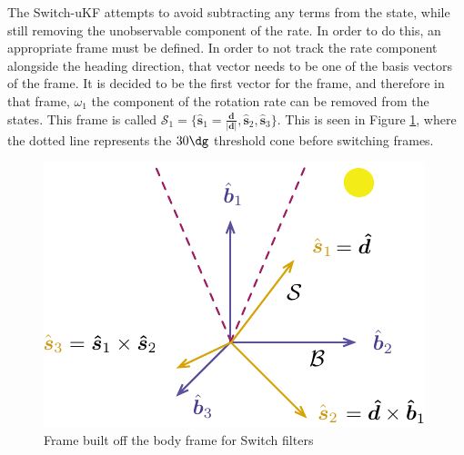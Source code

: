 \documentclass[]{BasiliskReportMemo}
\begin{document}
The Switch-uKF attempts to avoid subtracting any terms from the state, while still removing the unobservable component of the rate. In order to do this, an appropriate frame must be defined.
In order to not track the rate component alongside the heading direction, that vector needs to be one of the basis vectors of the frame. It is decided to be the first vector for the frame, and therefore in that frame, $\omega_1$ the component of the rotation rate can be removed from the states. 
This frame is called $\mathcal{S}_1 = \{\hat{\bm s}_1 = \frac{\bm d}{|\bm d|}, \hat{\bm s}_2, \hat{\bm s}_3 \}$. This is seen in Figure \ref{fig:Switches}, where the dotted line represents the $30 \dg$ threshold cone before switching frames. 

\begin{figure}[t]
	\centering
	\includegraphics[]{./Figures/Switches}
	\caption{Frame built off the body frame for Switch filters}
	\label{fig:Switches}
\end{figure}
\end{document}
